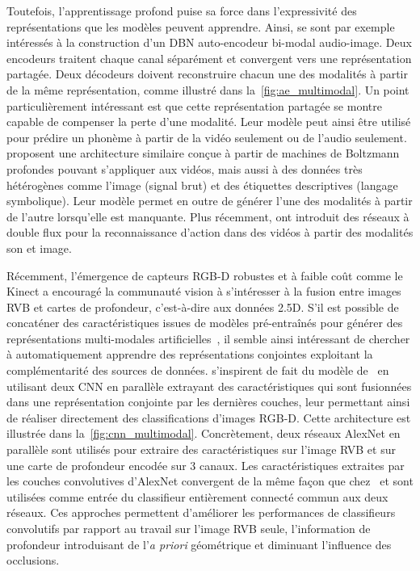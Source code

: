 Toutefois, l'apprentissage profond puise sa force dans l'expressivité des représentations que les modèles peuvent apprendre. Ainsi, \citet{ngiam_multimodal_2011} se sont par exemple intéressés à la construction d'un \gls{DBN} auto-encodeur bi-modal audio-image. Deux encodeurs traitent chaque canal séparément et convergent vers une représentation partagée. Deux décodeurs doivent reconstruire chacun une des modalités à partir de la même représentation, comme illustré dans la~\cref{fig:ae_multimodal}. Un point particulièrement intéressant est que cette représentation partagée se montre capable de compenser la perte d'une modalité. Leur modèle peut ainsi être utilisé pour prédire un phonème à partir de la vidéo seulement ou de l'audio seulement.
\citet{srivastava_multimodal_2014} proposent une architecture similaire conçue à partir de machines de Boltzmann profondes pouvant s'appliquer aux vidéos, mais aussi à des données très hétérogènes comme l'image (signal brut) et des étiquettes descriptives (langage symbolique). Leur modèle permet en outre de générer l'une des modalités à partir de l'autre lorsqu'elle est manquante. Plus récemment, \citet{simonyan_two-stream_2014} ont introduit des réseaux à double flux pour la reconnaissance d'action dans des vidéos à partir des modalités son et image.

Récemment, l'émergence de capteurs \gls{RGB-D} robustes et à faible coût comme le Kinect a encouragé la communauté vision à s'intéresser à la fusion entre images \gls{RVB} et cartes de profondeur, c'est-à-dire aux données \num{2,5}D. S'il est possible de concaténer des caractéristiques issues de modèles pré-entraînés pour générer des représentations multi-modales artificielles~\cite{schwarz_rgb-d_2015,lagrange_benchmarking_2015}, il semble ainsi intéressant de chercher à automatiquement apprendre des représentations conjointes exploitant la complémentarité des sources de données. \citet{eitel_multimodal_2015,guo_two-stream_2016,song_combining_2017} s'inspirent de fait du modèle de~\citet{ngiam_multimodal_2011} en utilisant deux \gls{CNN} en parallèle extrayant des caractéristiques qui sont fusionnées dans une représentation conjointe par les dernières couches, leur permettant ainsi de réaliser directement des classifications d'images \gls{RGB-D}. Cette architecture est illustrée dans la~\cref{fig:cnn_multimodal}. Concrètement, deux réseaux AlexNet en parallèle sont utilisés pour extraire des caractéristiques sur l'image \gls{RVB} et sur une carte de profondeur encodée sur 3 canaux. Les caractéristiques extraites par les couches convolutives d'AlexNet convergent de la même façon que chez~\citet{ngiam_multimodal_2011} et sont utilisées comme entrée du classifieur entièrement connecté commun aux deux réseaux. Ces approches permettent d'améliorer les performances de classifieurs convolutifs par rapport au travail sur l'image \gls{RVB} seule, l'information de profondeur introduisant de l'\emph{a priori} géométrique et diminuant l'influence des occlusions.

